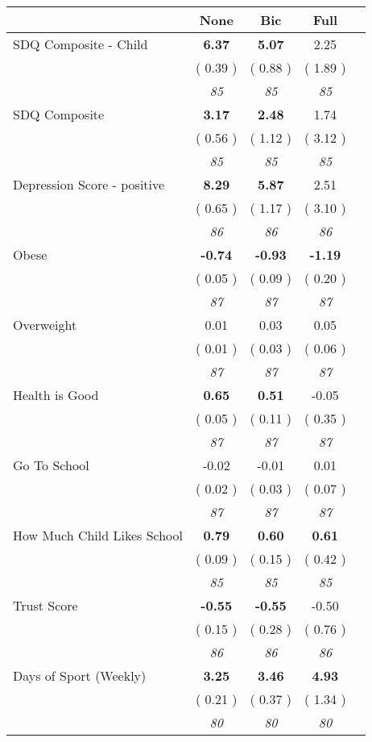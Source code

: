 \begin{tabular}{l c c c c}
\toprule
 & None & Bic & Full \\
\midrule
SDQ Composite - Child & \textbf{      6.37 } & \textbf{      5.07 } &      2.25 \\
& (     0.39 ) & (     0.88 ) & (     1.89 ) \\
& \textit{ 85 } & \textit{ 85 } & \textit{ 85 } \\
SDQ Composite & \textbf{      3.17 } & \textbf{      2.48 } &      1.74 \\
& (     0.56 ) & (     1.12 ) & (     3.12 ) \\
& \textit{ 85 } & \textit{ 85 } & \textit{ 85 } \\
Depression Score - positive & \textbf{      8.29 } & \textbf{      5.87 } &      2.51 \\
& (     0.65 ) & (     1.17 ) & (     3.10 ) \\
& \textit{ 86 } & \textit{ 86 } & \textit{ 86 } \\
Obese & \textbf{     -0.74 } & \textbf{     -0.93 } & \textbf{     -1.19 } \\
& (     0.05 ) & (     0.09 ) & (     0.20 ) \\
& \textit{ 87 } & \textit{ 87 } & \textit{ 87 } \\
Overweight &      0.01 &      0.03 &      0.05 \\
& (     0.01 ) & (     0.03 ) & (     0.06 ) \\
& \textit{ 87 } & \textit{ 87 } & \textit{ 87 } \\
Health is Good & \textbf{      0.65 } & \textbf{      0.51 } &     -0.05 \\
& (     0.05 ) & (     0.11 ) & (     0.35 ) \\
& \textit{ 87 } & \textit{ 87 } & \textit{ 87 } \\
Go To School &     -0.02 &     -0.01 &      0.01 \\
& (     0.02 ) & (     0.03 ) & (     0.07 ) \\
& \textit{ 87 } & \textit{ 87 } & \textit{ 87 } \\
How Much Child Likes School & \textbf{      0.79 } & \textbf{      0.60 } & \textbf{      0.61 } \\
& (     0.09 ) & (     0.15 ) & (     0.42 ) \\
& \textit{ 85 } & \textit{ 85 } & \textit{ 85 } \\
Trust Score & \textbf{     -0.55 } & \textbf{     -0.55 } &     -0.50 \\
& (     0.15 ) & (     0.28 ) & (     0.76 ) \\
& \textit{ 86 } & \textit{ 86 } & \textit{ 86 } \\
Days of Sport (Weekly) & \textbf{      3.25 } & \textbf{      3.46 } & \textbf{      4.93 } \\
& (     0.21 ) & (     0.37 ) & (     1.34 ) \\
& \textit{ 80 } & \textit{ 80 } & \textit{ 80 } \\
\bottomrule
\end{tabular}
